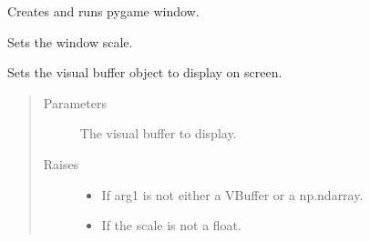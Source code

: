 \documentclass[letterpaper,10pt,english,openany,oneside]{sphinxmanual}
\begin{document}
\begin{fulllineitems}
\begin{fulllineitems}
\begin{quote}
\begin{description}
\end{description}\end{quote}

\end{fulllineitems}



\begin{fulllineitems}

\pysigstartsignatures
{}
\pysigstopsignatures
\sphinxAtStartPar
Creates and runs pygame window.

\end{fulllineitems}



\begin{fulllineitems}

\pysigstartsignatures
{}
\pysigstopsignatures
\sphinxAtStartPar
Sets the window scale.

\end{fulllineitems}



\begin{fulllineitems}

\pysigstartsignatures
{}
\pysigstopsignatures
\sphinxAtStartPar
Sets the visual buffer object to display on screen.
\begin{quote}\begin{description}
\item[{Parameters}] \leavevmode
\sphinxAtStartPar
{} \textendash{} The visual buffer to display.

\item[{Raises}] \leavevmode\begin{itemize}
\item {} 
\sphinxAtStartPar
{} \textendash{} If arg1 is not either a VBuffer or a np.ndarray.

\item {} 
\sphinxAtStartPar
{} \textendash{} If the scale is not a float.

\end{itemize}


\end{description}
\end{quote}
\end{fulllineitems}
\end{fulllineitems}
\end{document}
